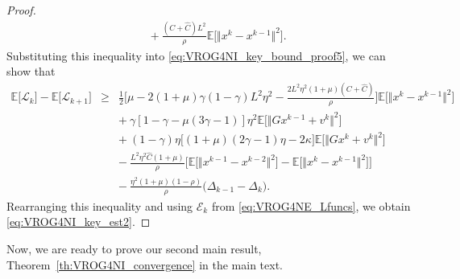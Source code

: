 \documentclass{article}
\newcommand{\norms}[1]{\Vert#1\Vert}
\newcommand{\Expk}[1]{\mathbb{E}\big[#1\big]}
\newcommand{\Lc}{\mathcal{L}}
\newcommand{\Ec}{\mathcal{E}}
\theoremstyle{plain}
\theoremstyle{definition}
\theoremstyle{remark}
\begin{document}
\begin{proof}
\begin{equation*}
\begin{array}{lcl}
&& + {~}  \frac{(C + \hat{C})L^2}{ \rho }  \Expk{ \norms{x^{k} - x^{k-1}}^2 }.
\end{array}
\end{equation*}
Substituting this inequality into \eqref{eq:VROG4NI_key_bound_proof5}, we can show that
\begin{equation*} 
\begin{array}{lcl}
\Expk{ \Lc_k } - \Expk{ \Lc_{k+1} } & \geq &  \frac{1}{2} \Big[ \mu -  2(1+\mu)\gamma(1-\gamma)L^2\eta^2 - \frac{2L^2\eta^2(1+\mu)(C + \hat{C})}{ \rho } \Big] \Expk{ \norms{x^k - x^{k-1}}^2 } \\
&& + {~} \gamma[ 1 - \gamma  - \mu(3\gamma-1)]\eta^2 \Expk{ \norms{Gx^{k-1} + v^k }^2 }  \\
&& + {~} (1-\gamma)\eta \big[  (1+\mu)(2\gamma - 1)\eta - 2\kappa \big]  \Expk{ \norms{Gx^k + v^k}^2 } \\
&& - {~} \frac{L^2\eta^2\hat{C}(1+\mu)}{ \rho } \Big[ \Expk{ \norms{x^{k-1} - x^{k-2}}^2 }  - \Expk{ \norms{x^k - x^{k-1}}^2 } \Big] \\
&& - {~} \frac{\eta^2(1+\mu)(1-\rho)}{\rho} \big( \Delta_{k-1} - \Delta_{k} \big).
\end{array}
\end{equation*}
Rearranging this inequality and using $\Ec_k$ from \eqref{eq:VROG4NE_Lfuncs}, we obtain \eqref{eq:VROG4NI_key_est2}.
\end{proof}

Now, we are ready to prove our second main result, Theorem~\ref{th:VROG4NI_convergence} in the main text.
\end{document}
